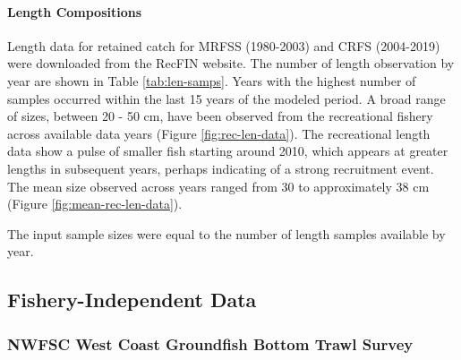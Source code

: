 \documentclass[11pt,
  english,
  a4paper,
]{article}
\begin{document}
\leavevmode\tagmcend\tagstructend\par


\hypertarget{length-compositions-1}{%
\paragraph{Length Compositions}\label{length-compositions-1}}

\leavevmode\tagmcend\tagstructend


Length data for retained catch for MRFSS (1980-2003) and CRFS (2004-2019) were downloaded from the RecFIN website. The number of length observation by year are shown in Table \ref{tab:len-samps}. Years with the highest number of samples occurred within the last 15 years of the modeled period. A broad range of sizes, between 20 - 50 cm, have been observed from the recreational fishery across available data years (Figure \ref{fig:rec-len-data}). The recreational length data show a pulse of smaller fish starting around 2010, which appears at greater lengths in subsequent years, perhaps indicating of a strong recruitment event. The mean size observed across years ranged from 30 to approximately 38 cm (Figure \ref{fig:mean-rec-len-data}).

\leavevmode\tagmcend\tagstructend\par


The input sample sizes were equal to the number of length samples available by year.

\leavevmode\tagmcend\tagstructend\par


\hypertarget{fishery-independent-data}{%
\subsection{Fishery-Independent Data}\label{fishery-independent-data}}

\leavevmode\tagmcend\tagstructend


\hypertarget{nwfsc-west-coast-groundfish-bottom-trawl-survey}{%
\subsubsection{NWFSC West Coast Groundfish Bottom Trawl Survey}\label{nwfsc-west-coast-groundfish-bottom-trawl-survey}}
\end{document}
